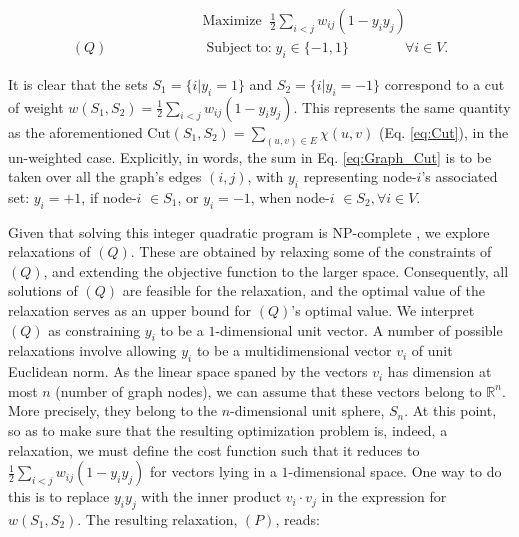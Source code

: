 \begin{equation}\label{eq:Graph_Cut}
  \begin{split}
  &\mathrm{Maximize}\;\;\frac{1}{2}\sum_{i<j}w_{i j}(1-y_{i}y_{j}) \\
  (Q)\qquad\qquad\qquad&\operatorname{Subject\;to:}y_{i}\in\{-1,1\}\qquad\qquad\forall i\in V.
  \end{split}
\end{equation}

\sloppy
\noindent It is clear that the sets $S_1 = \{i|y_i=1\}$ and $S_2 = \{i|y_i=-1\}$ correspond to a cut of weight $w(S_1, S_2) = \frac{1}{2}\sum_{i<j}w_{ij}\left(1-y_{i}y_{j}\right)$. This  represents the same quantity as the aforementioned $\text{Cut}(S_1, S_2) = \sum_{(u, v) \in E} \chi(u, v)$ (Eq. \ref{eq:Cut}), in the un-weighted case. Explicitly, in words, the sum in Eq. \ref{eq:Graph_Cut} is to be taken over all the graph's edges $(i, j)$, with $y_{i}$ representing node-$i$'s associated set: $y_{i}=+1$, if node-$i$ $\in S_1$, or $y_{i}=-1$, when node-$i$ $\in S_2, \forall i \in V$.

Given that solving this integer quadratic program is NP-complete \cite{GW-Algorithm}, we explore relaxations of $(Q)$. These are obtained by relaxing some of the constraints of $(Q)$, and extending the objective function to the larger space. Consequently, all solutions of $(Q)$ are feasible for the relaxation, and the optimal value of the relaxation serves as an upper bound for $(Q)$'s optimal value. We interpret $(Q)$ as constraining $y_i$ to be a $1$-dimensional unit vector. A number of possible relaxations involve allowing $y_i$ to be a multidimensional vector $v_i$ of unit Euclidean norm. As the linear space spaned by the vectors $v_i$ has dimension at most $n$ (number of graph nodes), we can assume that these vectors belong to $\mathbb{R}^{n}$. More precisely, they belong to the $n$-dimensional unit sphere, $S_n$. At this point, so as to make sure that the resulting optimization problem is, indeed, a relaxation, we must define the cost function such that it reduces to $\frac{1}{2}\sum_{i<j}w_{i j}(1-y_{i}y_{j})$ for vectors lying in a $1$-dimensional space. One way to do this is to replace $y_{i}y_{j}$ with the inner product $v_{i} \cdot v_{j}$ in the expression for $w(S_1, S_2)$. The resulting relaxation, $(P)$, reads:

